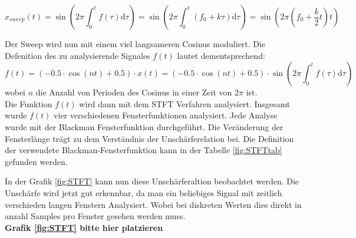 \begin{equation}
x_{sweep}(t)=\sin \left(2 \pi \int_{0}^{t} f(\tau) \mathrm{d} \tau\right)=\sin \left(2 \pi \int_{0}^{t}\left(f_{0}+k \tau\right) \mathrm{d} \tau\right)=\sin \left(2 \pi\left(f_{0}+\frac{k}{2} t\right) t\right)
\end{equation} 

Der Sweep wird nun mit einem viel langsameren Cosinus moduliert. Die Defenition des zu analysierende Signales $f(t)$ lautet dementsprechend:
\begin{equation}
f(t)= (-0.5\cdot \cos(nt)+0.5)\cdot x(t)=(-0.5\cdot \cos(nt)+0.5)\cdot \sin \left(2 \pi \int_{0}^{t} f(\tau) \mathrm{d} \tau\right)
\end{equation} \label{eq:sin-sweep}
wobei $n$ die Anzahl von Perioden des Cosinus in einer Zeit von $2\pi$ ist.\\
 Die Funktion $f(t)$  wird dann mit dem STFT Verfahren analysiert. Insgesamt wurde $f(t)$ vier verschiedenen Fensterfunktionen analysiert. Jede Analyse wurde mit der Blackman Fensterfunktion durchgeführt. Die Veränderung der Fensterlänge trägt zu dem Verständnis der Unschärferelation bei. Die Definition der verwendete Blackman-Fensterfunktion kann in der Tabelle \ref{fig:STFTtab} gefunden werden.\\
 \newpage

In der Grafik \ref{fig:STFT} kann nun diese Unschärferaltion beobachtet werden. Die Unschärfe wird jetzt gut erkennbar, da man ein beliebiges Signal mit zeitlich verschieden langen Fenstern Analysiert. Wobei bei diskreten Werten dies direkt in anzahl Samples pro Fenster gesehen werden muss.\\
\color{red}\textbf{Grafik \ref{fig:STFT} bitte hier platzieren} \color{black} %


